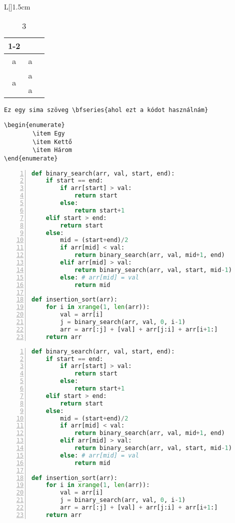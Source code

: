 \documentclass[]{article}
\begin{document}
\clearpage
\begin{table}[h]
\begin{wrapfigure}[5]{L}[\marginparwidth]{1.5cm}
\caption{3}
\begin{tabular}{|c|r|p{30pt}}
\cline{1-2}
\multicolumn{2}{|c|}{a}
\\ \hline
a&a
\\ \hline
\multirow{2}{1em}{a}&a
\\
&a
\\ \hline
\end{tabular}
\end{wrapfigure}
\hulipsum[1]
\end{table}
\verb|Ez egy sima szöveg \bfseries{ahol ezt a kódot használnám}|
\begin{verbatim}
\begin{enumerate}
        \item Egy
        \item Kettő
        \item Három
\end{enumerate}
\end{verbatim}
\begin{lstlisting}[language=python,tabsize=2,showspaces=false,showtabs=false,numbers=left,stepnumber=4,frame=single,framexleftmargin=20pt]
def binary_search(arr, val, start, end):
	if start == end:
		if arr[start] > val:
			return start
		else:
			return start+1
	elif start > end:
		return start
	else: 
		mid = (start+end)/2
		if arr[mid] < val:
			return binary_search(arr, val, mid+1, end)
		elif arr[mid] > val:
			return binary_search(arr, val, start, mid-1)
		else: # arr[mid] = val
			return mid
			
def insertion_sort(arr):
    for i in xrange(1, len(arr)):
        val = arr[i]
        j = binary_search(arr, val, 0, i-1)
        arr = arr[:j] + [val] + arr[j:i] + arr[i+1:]
    return arr
\end{lstlisting}
\clearpage
\lstset{tabsize=2,showspaces=false,showtabs=false,numbers=left,stepnumber=4,framexleftmargin=20pt}
\begin{lstlisting}[float=hb!,caption={Python},language=python,tabsize=2,showspaces=false,showtabs=false,numbers=left,stepnumber=4,frame=single,framexleftmargin=20pt]
def binary_search(arr, val, start, end):
	if start == end:
		if arr[start] > val:
			return start
		else:
			return start+1
	elif start > end:
		return start
	else: 
		mid = (start+end)/2
		if arr[mid] < val:
			return binary_search(arr, val, mid+1, end)
		elif arr[mid] > val:
			return binary_search(arr, val, start, mid-1)
		else: # arr[mid] = val
			return mid
			
def insertion_sort(arr):
    for i in xrange(1, len(arr)):
        val = arr[i]
        j = binary_search(arr, val, 0, i-1)
        arr = arr[:j] + [val] + arr[j:i] + arr[i+1:]
    return arr
\end{lstlisting}
\end{document}
